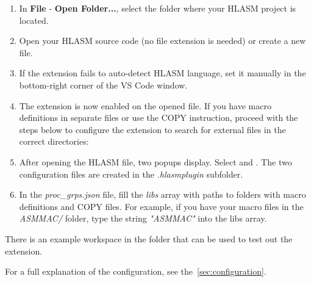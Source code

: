 \begin{enumerate}
	\item In \textbf{File} - \textbf{Open Folder...}, select the folder where your HLASM project is located.
	\item Open your HLASM source code (no file extension is needed) or create a new file.
	\item If the extension fails to auto-detect HLASM language, set it manually in the bottom-right corner of the VS Code window.  
	\item The extension is now enabled on the opened file. If you have macro definitions in separate files or use the COPY instruction, proceed with the steps below to configure the extension to search for external files in the correct directories:
	\item After opening the HLASM file, two popups display. Select  and . The two configuration files are created in the \emph{.hlasmplugin} subfolder.
	\item In the \emph{proc\_grps.json} file, fill the \emph{libs} array with paths to folders with macro definitions and COPY files. For example, if you have your macro files in the \emph{ASMMAC/} folder, type the string \emph{"ASMMAC"} into the libs array.
\end{enumerate}

There is an example workspace in the folder  that can be used to test out the extension.

For a full explanation of the configuration, see the~\cref{sec:configuration}.
